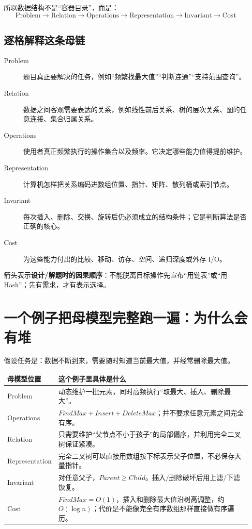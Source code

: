 \documentclass[11pt,a4paper,openany]{ctexbook}
\newcommand{\key}[1]{\textbf{\color{deep}#1}}
\begin{document}
所以数据结构不是“容器目录”，而是：
\[
\boxed{\text{Problem}\rightarrow\text{Relation}\rightarrow\text{Operations}\rightarrow\text{Representation}\rightarrow\text{Invariant}\rightarrow\text{Cost}}
\]

\subsection{逐格解释这条母链}
\begin{description}
  \item[Problem] 题目真正要解决的任务，例如“频繁找最大值”“判断连通”“支持范围查询”。
  \item[Relation] 数据之间客观需要表达的关系，例如线性前后关系、树的层次关系、图的任意连接、集合归属关系。
  \item[Operations] 使用者真正频繁执行的操作集合以及频率。它决定哪些能力值得提前维护。
  \item[Representation] 计算机怎样把关系编码进数组位置、指针、矩阵、散列桶或索引节点。
  \item[Invariant] 每次插入、删除、交换、旋转后仍必须成立的结构条件；它是判断算法是否正确的核心。
  \item[Cost] 为这些能力付出的比较、移动、访存、空间、递归深度或外存 I/O。
\end{description}
箭头表示\key{设计/解题时的因果顺序}：不能脱离目标操作先宣布“用链表”或“用 Hash”；先有需求，才有表示选择。

\section{一个例子把母模型完整跑一遍：为什么会有堆}
假设任务是：数据不断到来，需要随时知道当前最大值，并经常删除最大值。

\begin{longtable}{L{2.6cm}L{\dimexpr\linewidth-3.45cm\relax}}
\toprule
\textbf{母模型位置} & \textbf{这个例子里具体是什么}\\
\midrule
Problem & 动态维护一批元素，同时高频执行“取最大、插入、删除最大”。\\
Operations & $FindMax+Insert+DeleteMax$；并不要求任意元素之间完全有序。\\
Relation & 只需要维护“父节点不小于孩子”的局部偏序，并利用完全二叉树保证紧凑。\\
Representation & 完全二叉树可以直接用数组按下标表示父子位置，不必保存大量指针。\\
Invariant & 对任意父子，$Parent\ge Child$。插入/删除破坏后用上滤/下滤恢复。\\
Cost & $FindMax=O(1)$，插入和删除最大值沿树高调整，约 $O(\log n)$；代价是不能像完全有序数组那样直接做有序遍历。\\
\bottomrule
\end{longtable}
\end{document}
